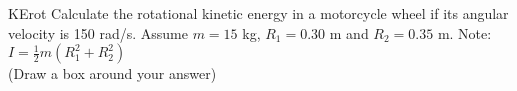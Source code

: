 \documentclass[letterpaper]{article}
\begin{document}
{\begin{question}{KErot }
  Calculate the rotational kinetic energy in a motorcycle wheel if its
  angular velocity is 150 rad/s.  Assume $m=15$ kg, $R_1=0.30$ m and
  $R_2=0.35$ m. Note: $I=\frac{1}{2}m(R_1^2+R_2^2)$ \\ (Draw a box around your answer)
\end{question}

\newpage

~

\cleardoublepage

~
}
\end{document}
